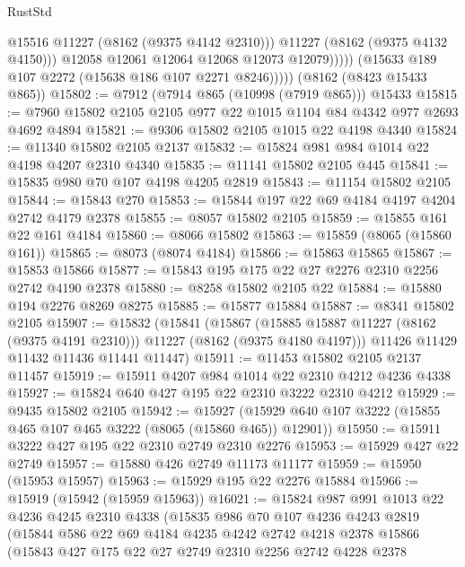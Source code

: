 \begin{lexlean}{RustStd}
\begin{coremodule}
                        @15516
                        @11227
                        (@8162 (@9375 @4142 @2310)))
                      @11227
                      (@8162 (@9375 @4132 @4150)))
                    @12058
                    @12061
                    @12064
                    @12068
                    @12073
                    @12079)))))
          (@15633 @189 @107 @2272 (@15638 @186 @107 @2271 @8246)))))
    (@8162 (@8423 @15433 @865))
@15802 := @7912 (@7914 @865 (@10998 (@7919 @865))) @15433
@15815 := @7960 @15802 @2105 @2105 @977 @22 @1015 @1104 @84 @4342 @977 @2693 @4692 @4894
@15821 := @9306 @15802 @2105 @1015 @22 @4198 @4340
@15824 := @11340 @15802 @2105 @2137
@15832 := @15824 @981 @984 @1014 @22 @4198 @4207 @2310 @4340
@15835 := @11141 @15802 @2105 @445
@15841 := @15835 @980 @70 @107 @4198 @4205 @2819
@15843 := @11154 @15802 @2105
@15844 := @15843 @270
@15853 := @15844 @197 @22 @69 @4184 @4197 @4204 @2742 @4179 @2378
@15855 := @8057 @15802 @2105
@15859 := @15855 @161 @22 @161 @4184
@15860 := @8066 @15802
@15863 := @15859 (@8065 (@15860 @161))
@15865 := @8073 (@8074 @4184)
@15866 := @15863 @15865
@15867 := @15853 @15866
@15877 := @15843 @195 @175 @22 @27 @2276 @2310 @2256 @2742 @4190 @2378
@15880 := @8258 @15802 @2105 @22
@15884 := @15880 @194 @2276 @8269 @8275
@15885 := @15877 @15884
@15887 := @8341 @15802 @2105
@15907 := @15832
    (@15841
      (@15867 (@15885 @15887 @11227 (@8162 (@9375 @4191 @2310))) @11227 (@8162 (@9375 @4180 @4197)))
      @11426
      @11429
      @11432
      @11436
      @11441
      @11447)
@15911 := @11453 @15802 @2105 @2137 @11457
@15919 := @15911 @4207 @984 @1014 @22 @2310 @4212 @4236 @4338
@15927 := @15824 @640 @427 @195 @22 @2310 @3222 @2310 @4212
@15929 := @9435 @15802 @2105
@15942 := @15927 (@15929 @640 @107 @3222 (@15855 @465 @107 @465 @3222 (@8065 (@15860 @465)) @12901))
@15950 := @15911 @3222 @427 @195 @22 @2310 @2749 @2310 @2276
@15953 := @15929 @427 @22 @2749
@15957 := @15880 @426 @2749 @11173 @11177
@15959 := @15950 (@15953 @15957)
@15963 := @15929 @195 @22 @2276 @15884
@15966 := @15919 (@15942 (@15959 @15963))
@16021 := @15824
    @987
    @991
    @1013
    @22
    @4236
    @4245
    @2310
    @4338
    (@15835
      @986
      @70
      @107
      @4236
      @4243
      @2819
      (@15844
        @586
        @22
        @69
        @4184
        @4235
        @4242
        @2742
        @4218
        @2378
        @15866
        (@15843
          @427
          @175
          @22
          @27
          @2749
          @2310
          @2256
          @2742
          @4228
          @2378

\end{coremodule}
\end{lexlean}
